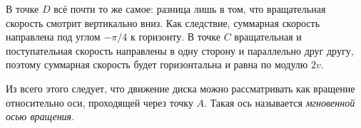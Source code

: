 В точке $D$ всё почти то же самое: разница лишь в том, что
вращательная скорость смотрит вертикально вниз. Как следствие,
суммарная скорость направлена под углом $-\pi/4$ к горизонту. В точке
$C$ вращательная и поступательная скорость направлены в одну сторону и
параллельно друг другу, поэтому суммарная скорость будет
горизонтальна и равна по модулю $2v$. 

Из всего этого следует, что движение диска можно рассматривать как
вращение относительно оси, проходящей через точку $A$. Такая ось
называется \textit{мгновенной осью вращения}. 

\vspace{1cm}
\parindent=0pt






